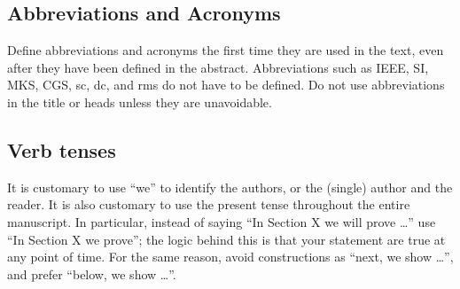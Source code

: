 \documentclass[letterpaper, 10 pt, conference]{ieeeconf}
\begin{document}
\subsection{Abbreviations and Acronyms}\label{sec:abbreviations}
Define abbreviations and acronyms the first time they are used in the text, even after they have been defined in the abstract. Abbreviations such as IEEE, SI, MKS, CGS, sc, dc, and rms do not have to be defined. Do not use abbreviations in the title or heads unless they are unavoidable.

\subsection{Verb tenses}
It is customary to use ``we'' to identify the authors, or the (single) author and the reader. It is also customary to use the present tense throughout the entire manuscript. In particular, instead of saying ``In Section X we will prove \ldots'' use ``In Section X we prove''; the logic behind this is that your statement are true at any point of time. For the same reason, avoid constructions as ``next, we show \ldots'', and prefer ``below, we show \ldots''.
\end{document}
